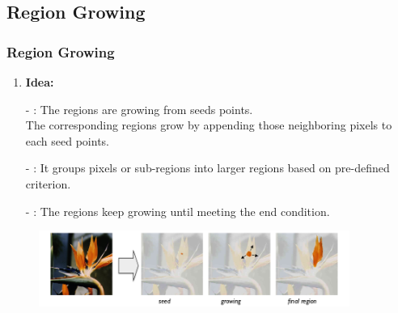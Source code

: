 \documentclass[notheorems,mathserif,table,compress]{beamer}  %
\begin{document}
\subsection{Region Growing}
\begin{frame}
    \frametitle{Region Growing}
    \begin{enumerate}[{\color{black}{\Large (A)}}]
    \item \textbf{\Large Idea:}
    \end{enumerate}
    	\begin{itemize}
    	\item[-] {\color{blue}{Seed}}: The regions are growing from seeds points.\\ \hspace{0.4in}The corresponding regions grow by appending those neighboring pixels to each seed points.
	\item[-] {\color{blue}{Pre-defined Criterion}}: It groups pixels or sub-regions into larger regions based on pre-defined criterion.
	\item[-] {\color{blue}{End Condition}}: The regions keep growing until meeting the end condition.
    	\end{itemize}
  \begin{figure}[!ht]
  \centering\includegraphics[width=4.0in]{region1.png}
  \end{figure} 
\end{frame}
\end{document}

